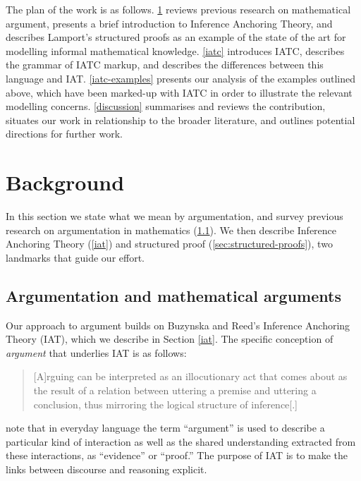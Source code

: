 \documentclass[smallextended,oneside]{svjour3}       %
\let\cite\citep
\newcommand\nothing[1]{#1}
\let\thesis\nothing
\begin{document}
The plan of the work is as follows.
\textsection\ref{background} reviews previous research on mathematical
argument, presents a brief introduction to Inference Anchoring Theory, and
describes Lamport's structured
proofs as an example of the state of the art for
modelling informal mathematical knowledge.
\textsection\ref{iatc} introduces IATC, describes the grammar of IATC markup,
and describes the differences between this language and IAT.
\textsection\ref{iatc-examples} presents our analysis of the examples
outlined above, which have been marked-up with IATC in order to
illustrate the relevant modelling concerns.
\textsection\ref{discussion} summarises and reviews the contribution,
situates our work in relationship to the broader literature, and
outlines potential directions for further work.

\section{Background}\label{background}

\thesis{In this section we state what we
mean by argumentation, and survey previous
  research on argumentation in mathematics
  (\textsection\ref{argmath}).}  We then describe Inference
Anchoring Theory (\textsection\ref{iat}) and structured proof
(\textsection\ref{sec:structured-proofs}), two landmarks that
guide our effort.

\subsection{Argumentation and mathematical arguments}\label{argmath}

Our approach to argument builds on Buzynska and Reed's
Inference Anchoring Theory (IAT), which we describe in
Section \ref{iat}.  The specific conception of \emph{argument} that
underlies IAT is as follows:
\begin{quote}
[A]rguing can be interpreted as an illocutionary act that comes about as
the result of a relation between uttering a premise and uttering a
conclusion, thus mirroring the logical structure of inference[.]  \cite[p.~146]{Reed2017}
\end{quote}
\citet{reed2011dialogues} note that in everyday language the term
``argument'' is used to describe a particular kind of interaction
as well as the shared understanding extracted from these
interactions, as ``evidence'' or ``proof.''
The purpose of IAT is to make the links between discourse and reasoning explicit.
\end{document}
